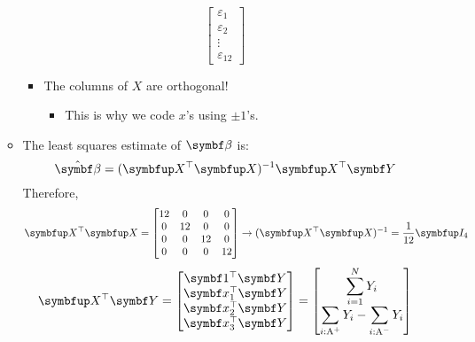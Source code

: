 \begin{itemize}
\begin{itemize}
\[\begin{bmatrix}
                            \varepsilon_1 \\
                            \varepsilon_2 \\
                            \vdots        \\
                            \varepsilon_{12}
                        \end{bmatrix} \]
                    \begin{itemize}[*]
                        \item The columns of $ X $ are orthogonal!
                              \begin{itemize}
                                  \item This is why we code $ x $'s using $ \pm 1 $'s.
                              \end{itemize}
                    \end{itemize}
              \item The least squares estimate of $ \Vector{\beta} $ is:
                    \[ \hat{\RandomVector{\beta}}=(\Matrix{X}^\top\Matrix{X})^{-1}\Matrix{X}^\top \RandomVector{Y} \]
                    Therefore,
                    \[ \Matrix{X}^\top\Matrix{X}=\begin{bmatrix}
                            12 & 0  & 0  & 0  \\
                            0  & 12 & 0  & 0  \\
                            0  & 0  & 12 & 0  \\
                            0  & 0  & 0  & 12
                        \end{bmatrix}\rightarrow
                        (\Matrix{X}^\top\Matrix{X})^{-1}=\frac{1}{12}\Matrix{I}_{4} \]
                    \[ \Matrix{X}^\top\RandomVector{Y}=\begin{bmatrix}
                            \Vector{1}^\top \RandomVector{Y}   \\
                            \Vector{x}_1^\top \RandomVector{Y} \\
                            \Vector{x}_2^\top \RandomVector{Y} \\
                            \Vector{x}_3^\top \RandomVector{Y}
                        \end{bmatrix}=\begin{bmatrix}
                            \displaystyle \sum_{i=1}^{N} Y_i                            \\
                            \displaystyle \sum_{i:\text{A}^+}Y_i-\sum_{i:\text{A}^-}Y_i \\

\end{bmatrix}\]
\end{itemize}
\end{itemize}
